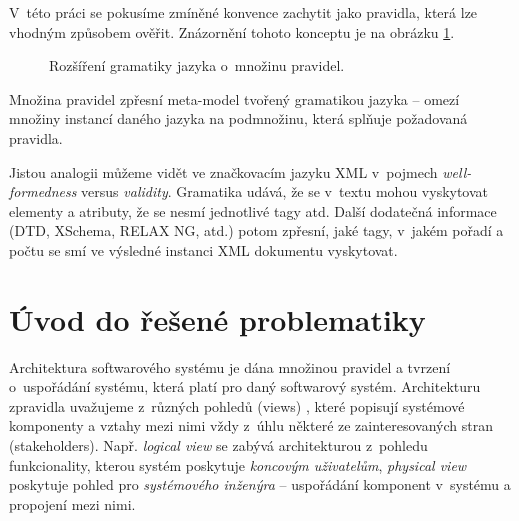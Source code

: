 V~této práci se pokusíme zmíněné konvence zachytit jako pravidla, která lze vhodným způsobem ověřit. Znázornění tohoto konceptu je na obrázku \ref{work_scope}.
\begin{figure}[h!]
  \centering
  \caption{Rozšíření gramatiky jazyka o~množinu pravidel.\label{work_scope}}
\end{figure}
Množina pravidel zpřesní meta-model tvořený gramatikou jazyka -- omezí množiny instancí daného jazyka na podmnožinu, která splňuje požadovaná pravidla.

Jistou analogii můžeme vidět ve značkovacím jazyku XML v~pojmech \emph{well-formedness} versus \emph{validity}. Gramatika udává, že se v~textu mohou vyskytovat elementy a atributy, že se nesmí  jednotlivé tagy atd. Další dodatečná informace (DTD, XSchema, RELAX NG, atd.) potom zpřesní, jaké tagy, v~jakém pořadí a počtu se smí ve výsledné instanci XML dokumentu vyskytovat.

\section{Úvod do řešené problematiky}

Architektura softwarového systému \cite{wiki:software_architecture} je dána množinou pravidel a tvrzení o~uspořádání systému, která platí pro daný softwarový systém. Architekturu zpravidla uvažujeme z~různých pohledů (views) \cite{wiki:four_plus_one_views}, které popisují systémové komponenty a vztahy mezi nimi vždy z~úhlu některé ze zainteresovaných stran (stakeholders). Např. \emph{logical view} se zabývá architekturou z~pohledu funkcionality, kterou systém poskytuje \emph{koncovým uživatelům}, \emph{physical view} poskytuje pohled pro \emph{systémového inženýra} -- uspořádání komponent v~systému a propojení mezi nimi.

